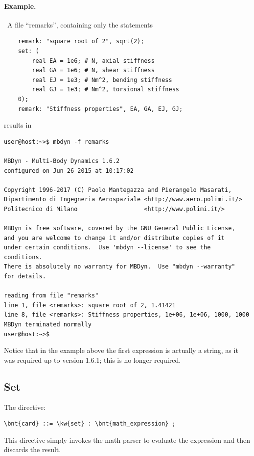 \paragraph{Example.} \
A file ``remarks'', containing only the statements
\begin{verbatim}
    remark: "square root of 2", sqrt(2);
    set: (
        real EA = 1e6; # N, axial stiffness
        real GA = 1e6; # N, shear stiffness
        real EJ = 1e3; # Nm^2, bending stiffness
        real GJ = 1e3; # Nm^2, torsional stiffness
    0);
    remark: "Stiffness properties", EA, GA, EJ, GJ;
\end{verbatim}
results in
\begin{verbatim}
user@host:~>$ mbdyn -f remarks

MBDyn - Multi-Body Dynamics 1.6.2
configured on Jun 26 2015 at 10:17:02

Copyright 1996-2017 (C) Paolo Mantegazza and Pierangelo Masarati,
Dipartimento di Ingegneria Aerospaziale <http://www.aero.polimi.it/>
Politecnico di Milano                   <http://www.polimi.it/>

MBDyn is free software, covered by the GNU General Public License,
and you are welcome to change it and/or distribute copies of it
under certain conditions.  Use 'mbdyn --license' to see the conditions.
There is absolutely no warranty for MBDyn.  Use "mbdyn --warranty"
for details.

reading from file "remarks"
line 1, file <remarks>: square root of 2, 1.41421
line 8, file <remarks>: Stiffness properties, 1e+06, 1e+06, 1000, 1000
MBDyn terminated normally
user@host:~>$
\end{verbatim}
Notice that in the example above the first expression is actually a string,
as it was required up to version 1.6.1; this is no longer required.

\subsection{Set}
The  directive:
\begin{Verbatim}[commandchars=\\\{\}]
    \bnt{card} ::= \kw{set} : \bnt{math_expression} ;
\end{Verbatim}
This directive simply invokes the math parser to evaluate the expression
\nt{math\_expression} and then discards the result.

